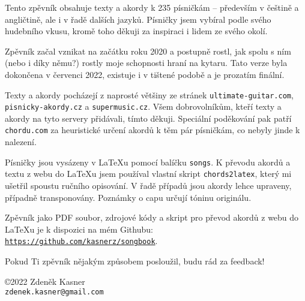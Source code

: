 \documentclass{article}
\begin{document}
\begin{center}
  \vfill

  Tento zpěvník obsahuje texty a akordy k 235 písničkám -- především v češtině a angličtině, ale i v řadě dalších jazyků. Písničky jsem vybíral podle svého hudebního vkusu, kromě toho děkuji za inspiraci i lidem ze svého okolí.  \\ \vspace*{0.5cm}

  Zpěvník začal vznikat na začátku roku 2020 a postupně rostl, jak spolu s ním (nebo i díky němu?) rostly moje schopnosti hraní na kytaru. Tato verze byla dokončena v červenci 2022, existuje i v tištené podobě a je prozatím finální. \\ \vspace*{0.5cm}

  Texty a akordy pocházejí z naprosté většiny ze stránek \texttt{ultimate-guitar.com}, \texttt{pisnicky-akordy.cz} a \texttt{supermusic.cz}. Všem dobrovolníkům, kteří texty a akordy na tyto servery přidávali, tímto děkuji. Speciální poděkování pak patří \texttt{chordu.com} za heuristické určení akordů k těm pár písničkám, co nebyly jinde k nalezení.  \\ \vspace*{0.5cm}

  Písničky jsou vysázeny v \LaTeX u pomocí balíčku \texttt{songs}. K převodu akordů a textu z webu do \LaTeX u jsem používal vlastní skript \texttt{chords2latex}, který mi ušetřil spoustu ručního opisování. V řadě případů jsou akordy lehce upraveny, případně transponovány. Poznámky o capu určují tóninu originálu. \\ \vspace*{0.5cm}

  Zpěvník jako PDF soubor, zdrojové kódy a skript pro převod akordů z webu do \LaTeX u je k dispozici na mém Githubu: \texttt{\url{https://github.com/kasnerz/songbook}}.  \\ \vspace*{0.5cm}

  Pokud Ti zpěvník nějakým způsobem posloužil, budu rád za feedback! \\ \vspace*{0.5cm}


  \copyright 2022 Zdeněk Kasner \\ \vspace*{0.1cm}
  \texttt{zdenek.kasner@gmail.com} \\ \vspace*{0.5cm}
  \byncsa
\end{center}

\end{document}
